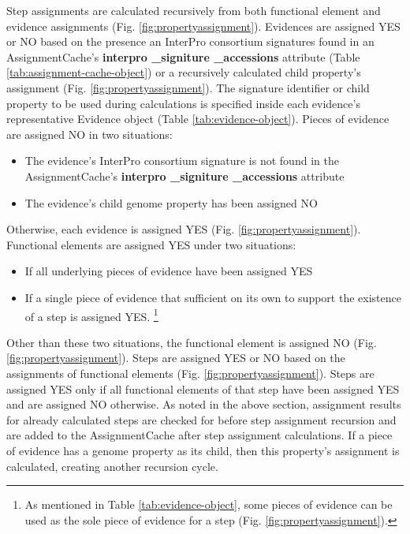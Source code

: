 Step assignments are calculated recursively from both functional element and evidence assignments (Fig. \ref{fig:propertyassignment}). Evidences are assigned YES or NO based on the presence an InterPro consortium signatures found in an AssignmentCache's \textbf{interpro \_signiture \_accessions} attribute (Table \ref{tab:assignment-cache-object}) or a recursively calculated child property's assignment (Fig. \ref{fig:propertyassignment}). The signature identifier or child property to be used during calculations is specified inside each evidence's representative Evidence object (Table \ref{tab:evidence-object}). Pieces of evidence are assigned NO in two situations: 

\begin{itemize}
\item The evidence's InterPro consortium signature is not found in the AssignmentCache's \textbf{interpro \_signiture \_accessions} attribute 
\item The evidence's child genome property has been assigned NO 
\end{itemize}
Otherwise, each evidence is assigned YES (Fig. \ref{fig:propertyassignment}). Functional elements are assigned YES under two situations: 

\begin{itemize}
\item If all underlying pieces of evidence have been assigned YES
\item If a single piece of evidence that sufficient on its own to support the existence of a step is assigned YES. \footnote{As mentioned in Table \ref{tab:evidence-object}, some pieces of evidence can be used as the sole piece of evidence for a step (Fig. \ref{fig:propertyassignment}).}
\end{itemize}

Other than these two situations, the functional element is assigned NO (Fig. \ref{fig:propertyassignment}). Steps are assigned YES or NO based on the assignments of functional elements (Fig. \ref{fig:propertyassignment}). Steps are assigned YES only if all functional elements of that step have been assigned YES and are assigned NO otherwise. As noted in the above section, assignment results for already calculated steps are checked for before step assignment recursion and are added to the AssignmentCache after step assignment calculations. If a piece of evidence has a genome property as its child, then this property's assignment is calculated, creating another recursion cycle.

